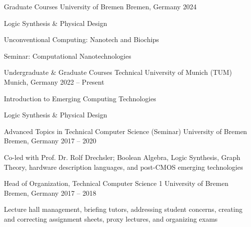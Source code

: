 

\begin{cventries}

  \cventry
    {Graduate Courses} %
    {University of Bremen} %
    {Bremen, Germany} %
    {2024} %
    {
      \begin{cvitems} %
        \item {Logic Synthesis \& Physical Design}
        \item {Unconventional Computing: Nanotech and Biochips}
        \item {Seminar: Computational Nanotechnologies}
      \end{cvitems}
    }

  \cventry
    {Undergraduate \& Graduate Courses} %
    {Technical University of Munich (TUM)} %
    {Munich, Germany} %
    {2022 -- Present} %
    {
      \begin{cvitems} %
        \item {Introduction to Emerging Computing Technologies}
        \item {Logic Synthesis \& Physical Design}
      \end{cvitems}
    }

  \cventry
    {Advanced Topics in Technical Computer Science (Seminar)} %
    {University of Bremen} %
    {Bremen, Germany} %
    {2017 -- 2020} %
    {
      \begin{cvitems} %
        \item {Co-led with Prof. Dr. Rolf Drechsler; Boolean Algebra, Logic Synthesis, Graph Theory, hardware description languages, and post-CMOS emerging technologies}
      \end{cvitems}
    }

  \cventry
    {Head of Organization, Technical Computer Science 1} %
    {University of Bremen} %
    {Bremen, Germany} %
    {2017 -- 2018} %
    {
      \begin{cvitems} %
        \item {Lecture hall management, briefing tutors, addressing student concerns, creating and correcting assignment sheets, proxy lectures, and organizing exams}
      \end{cvitems}
    }


\end{cventries}
